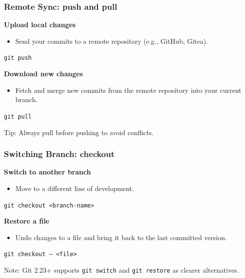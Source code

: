 \documentclass[aspectratio=169]{beamer}
\begin{document}
\begin{frame}
  \frametitle{Remote Sync: push and pull}

  \textbf{Upload local changes}
  \begin{itemize}
    \item Send your commits to a remote repository (e.g., GitHub, Gitea).
  \end{itemize}
  \vspace{0.3em}
  \texttt{git push}

  \vspace{1em}
  \textbf{Download new changes}
  \begin{itemize}
    \item Fetch and merge new commits from the remote repository into your current branch.
  \end{itemize}
  \vspace{0.3em}
  \texttt{git pull}

  \vspace{1em}
  Tip: Always pull before pushing to avoid conflicts.
\end{frame}


\begin{frame}
  \frametitle{Switching Branch: checkout}

  \textbf{Switch to another branch}
  \begin{itemize}
    \item Move to a different line of development.
  \end{itemize}
  \vspace{0.3em}
  \texttt{git checkout <branch-name>}

  \vspace{1em}
  \textbf{Restore a file}
  \begin{itemize}
    \item Undo changes to a file and bring it back to the last committed version.
  \end{itemize}
  \vspace{0.3em}
  \texttt{git checkout -- <file>}

  \vspace{1em}
  Note: Git 2.23+ supports \texttt{git switch} and \texttt{git restore} as clearer alternatives.
\end{frame}
\end{document}
